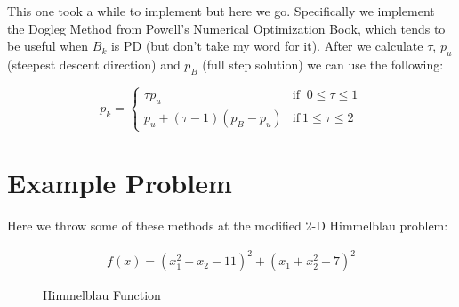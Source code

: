 \documentclass[12pt]{article}
\begin{document}
This one took a while to implement but here we go. Specifically we implement the Dogleg Method from Powell's Numerical Optimization Book, which tends to be useful when $B_k$ is PD (but don't take my word for it). After we calculate $\tau$, $p_u$ (steepest descent direction) and $p_B$ (full step solution) we can use the following:

\vspace{5mm}

\begin{equation}
p_k=
\begin{cases}
    \tau p_u & \text{if } \: 0 \leq \tau \leq 1\\
    p_u+(\tau-1)(p_B-p_u) & \text{if} \: 1 \leq \tau \leq 2
\end{cases}
\end{equation}

\section{Example Problem}

Here we throw some of these methods at the modified 2-D Himmelblau problem:

\begin{align*}
f(x) = (x_1^2 + x_2 - 11)^2 + (x_1 + x_2^2 - 7)^2
\end{align*}

\begin{figure}[h]
\centering
{}
\caption{Himmelblau Function}
\end{figure}

\vspace{5mm}
\end{document}
